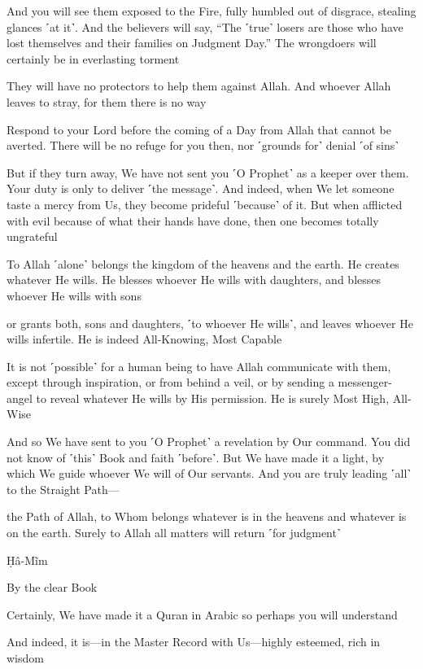 And you will see them exposed to the Fire, fully humbled out of disgrace, stealing glances ˹at it˺. And the believers will say, “The ˹true˺ losers are those who have lost themselves and their families on Judgment Day.” The wrongdoers will certainly be in everlasting torment

They will have no protectors to help them against Allah. And whoever Allah leaves to stray, for them there is no way

Respond to your Lord before the coming of a Day from Allah that cannot be averted. There will be no refuge for you then, nor ˹grounds for˺ denial ˹of sins˺

But if they turn away, We have not sent you ˹O Prophet˺ as a keeper over them. Your duty is only to deliver ˹the message˺. And indeed, when We let someone taste a mercy from Us, they become prideful ˹because˺ of it. But when afflicted with evil because of what their hands have done, then one becomes totally ungrateful

To Allah ˹alone˺ belongs the kingdom of the heavens and the earth. He creates whatever He wills. He blesses whoever He wills with daughters, and blesses whoever He wills with sons

or grants both, sons and daughters, ˹to whoever He wills˺, and leaves whoever He wills infertile. He is indeed All-Knowing, Most Capable

It is not ˹possible˺ for a human being to have Allah communicate with them, except through inspiration, or from behind a veil, or by sending a messenger-angel to reveal whatever He wills by His permission. He is surely Most High, All-Wise

And so We have sent to you ˹O Prophet˺ a revelation by Our command. You did not know of ˹this˺ Book and faith ˹before˺. But We have made it a light, by which We guide whoever We will of Our servants. And you are truly leading ˹all˺ to the Straight Path—

the Path of Allah, to Whom belongs whatever is in the heavens and whatever is on the earth. Surely to Allah all matters will return ˹for judgment˺

Ḥâ-Mĩm

By the clear Book

Certainly, We have made it a Quran in Arabic so perhaps you will understand

And indeed, it is—in the Master Record with Us—highly esteemed, rich in wisdom

